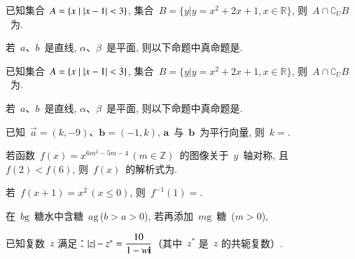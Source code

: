 \documentclass[marginline]{BHCexam}
\begin{document}
\begin{questions}
\question 已知集合~$A=\{x\mid \left| x-1 \right|<3 \}$,
集合~$B=\{y| y=x^2+2x+1,x\in\mathbb{R}\}$, 则~$A\cap
\complement_U B$~为.

\twoch{$[\,0,4)$}{$(-\infty,-2\,]\cup[4,+\infty)$}{$(-2,0)$}{$(0,4)$}

\question 若~$a$、$b$~是直线, $\alpha$、$\beta$~是平面,
则以下命题中真命题是.\\

\question 已知集合~$A=\{x\mid \left| x-1 \right|<3 \}$,
集合~$B=\{y| y=x^2+2x+1,x\in\mathbb{R}\}$, 则~$A\cap
\complement_U B$~为.

\twoch{$[\,0,4)$}{$(-\infty,-2\,]\cup[4,+\infty)$}{$(-2,0)$}{$(0,4)$}

\question 若~$a$、$b$~是直线, $\alpha$、$\beta$~是平面,
则以下命题中真命题是.\\



\tiankong
\question 已知~$\vec{a}=(k,-9)$、$\bm{b}=(-1,k)$, $\bm{a}$~与~$\bm{b}$~为平行向量,
    则~$k=$.

\question 若函数~$f(x)=x^{6m^2-5m-4}\,(m\in\mathbb{Z})$~的图像关于~$y$~轴对称,
    且~$f(2)<f(6)$, 则~$f(x)$~的解析式为.

\question 若~$f(x+1)=x^2\,(x\leq0)$, 则~$f^{-1}(1)=$.

\question 在~$b\text{g}$~糖水中含糖~$a\text{g}$\,($b>a>0$), 若再添加~$m\text{g}$~糖~($m>0$),




\jiandaa
\question 已知复数~$z$ 满足：$\left| z \right|-z^*=\dfrac{10}{1-w\textbf{i}}$（其中~$z^*$
是~$z$ 的共轭复数）.


\end{questions}
\end{document}
